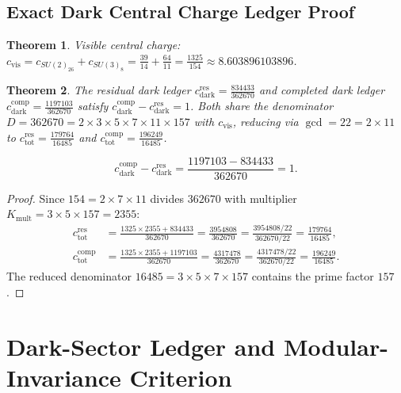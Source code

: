 \documentclass[11pt]{article}
\theoremstyle{plain}
\newtheorem{theorem}{Theorem}
\begin{document}
\subsection{Exact Dark Central Charge Ledger Proof}
\label{app:coset-anomaly-extractions}
\begin{theorem}
Visible central charge: $c_{\text{vis}} = c_{SU(2)_{26}} + c_{SU(3)_8} = \frac{39}{14} + \frac{64}{11} = \frac{1325}{154} \approx 8.603896103896$.
\end{theorem}

\begin{theorem}
The residual dark ledger $c_{\text{dark}}^{\text{res}} = \frac{834433}{362670}$ and completed dark ledger $c_{\text{dark}}^{\text{comp}} = \frac{1197103}{362670}$ satisfy $c_{\text{dark}}^{\text{comp}} - c_{\text{dark}}^{\text{res}} = 1$. Both share the denominator $D = 362670 = 2 \times 3 \times 5 \times 7 \times 11 \times 157$ with $c_{\text{vis}}$, reducing via $\gcd = 22 = 2 \times 11$ to $c_{\text{tot}}^{\text{res}} = \frac{179764}{16485}$ and $c_{\text{tot}}^{\text{comp}} = \frac{196249}{16485}$.
\end{theorem}

\begin{equation}
\label{eq:dark-completion-fraction}
 c_{\text{dark}}^{\text{comp}}-c_{\text{dark}}^{\text{res}}
 =
 \frac{1197103-834433}{362670}
 =1.
\end{equation}

\begin{proof}
Since $154 = 2 \times 7 \times 11$ divides $362670$ with multiplier $K_{\text{mult}} = 3 \times 5 \times 157 = 2355$:
\begin{align}
c_{\text{tot}}^{\text{res}} &= \frac{1325 \times 2355 + 834433}{362670} = \frac{3954808}{362670} = \frac{3954808 / 22}{362670 / 22} = \frac{179764}{16485}, \\
c_{\text{tot}}^{\text{comp}} &= \frac{1325 \times 2355 + 1197103}{362670} = \frac{4317478}{362670} = \frac{4317478 / 22}{362670 / 22} = \frac{196249}{16485}.
\end{align}
The reduced denominator $16485 = 3 \times 5 \times 7 \times 157$ contains the prime factor $157$.
\end{proof}

\section{Dark-Sector Ledger and Modular-Invariance Criterion}
\label{app:dark-cft-criterion}
\end{document}
